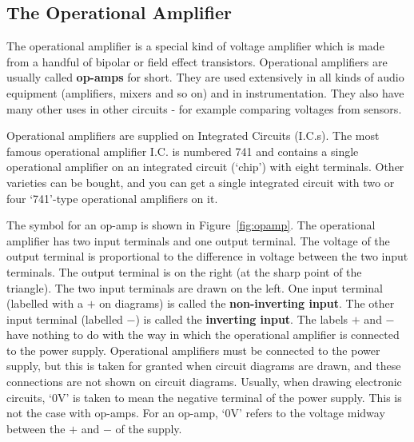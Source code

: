 \subsection{The Operational Amplifier}

The operational amplifier is a special kind of voltage amplifier which is made from a handful of bipolar or field effect transistors.  Operational amplifiers are usually called {\bf op-amps} for short.  They are used extensively in all kinds of audio equipment (amplifiers, mixers and so on) and in instrumentation.  They also have many other uses in other circuits - for example comparing voltages from sensors.

Operational amplifiers are supplied on Integrated Circuits (I.C.s).  The most famous operational amplifier I.C. is numbered 741 and contains a single operational amplifier on an integrated circuit (`chip') with eight terminals.  Other varieties can be bought, and you can get a single integrated circuit with two or four `741'-type operational amplifiers on it.

The symbol for an op-amp is shown in Figure~\ref{fig:opamp}. The operational amplifier has two input terminals and one output terminal.  The voltage of the output terminal is proportional to the difference in voltage between the two input terminals.  The output terminal is on the right (at the sharp point of the triangle).  The two input terminals are drawn on the left.  
One input terminal (labelled with a $+$ on diagrams) is called the {\bf non-inverting input}.  The other input terminal (labelled $-$) is called the {\bf inverting input}.  The labels $+$ and $-$ have nothing to do with the way in which the operational amplifier is connected to the power supply.  Operational amplifiers must be connected to the power supply, but this is taken for granted when circuit diagrams are drawn, and these connections are not shown on circuit diagrams.  Usually, when drawing electronic circuits, `0V' is taken to mean the negative terminal of the power supply.  This is not the case with op-amps.  For an op-amp, `0V' refers to the voltage midway between the $+$ and $-$ of the supply.


